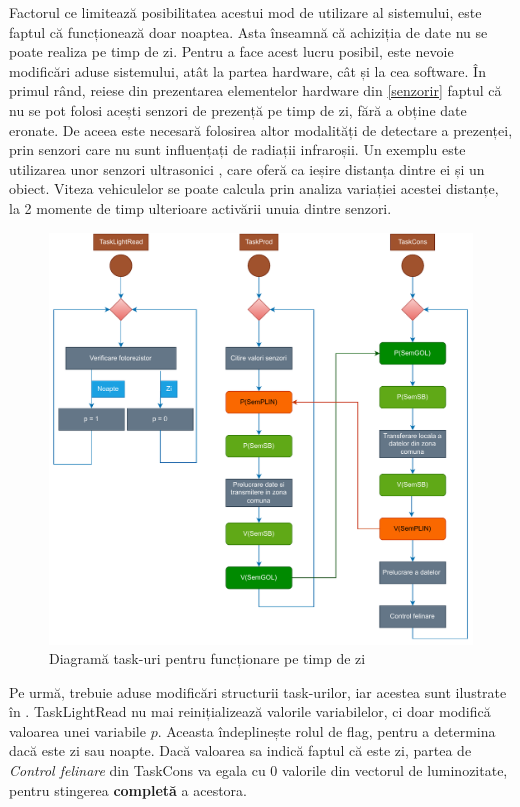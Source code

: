 Factorul ce limitează posibilitatea acestui mod de utilizare al sistemului, este faptul că funcționează doar noaptea. Asta înseamnă că achiziția de date nu se poate realiza pe timp de zi. Pentru a face acest lucru posibil, este nevoie modificări aduse sistemului, atât la partea hardware, cât și la cea software. În primul rând, reiese din prezentarea elementelor hardware din \autoref{senzorir} faptul că nu se pot folosi acești senzori de prezență pe timp de zi, fără a obține date eronate. De aceea este necesară folosirea altor modalități de detectare a prezenței, prin senzori care nu sunt influențați de radiații infraroșii. Un exemplu este utilizarea unor senzori ultrasonici \cite{7456689}, care oferă ca ieșire distanța dintre ei și un obiect. Viteza vehiculelor se poate calcula prin analiza variației acestei distanțe, la 2 momente de timp ulterioare activării unuia dintre senzori.

\begin{figure}[!ht]
    \begin{center}
    \includegraphics[width=0.9\linewidth,keepaspectratio]{pics/diag2.drawio.pdf}
    \end{center}
    \caption{Diagramă task-uri pentru funcționare pe timp de zi}
    \label{fig:dtask2}
\end{figure}

Pe urmă, trebuie aduse modificări structurii task-urilor, iar acestea sunt ilustrate în . TaskLightRead nu mai reinițializează valorile variabilelor, ci doar modifică valoarea unei variabile $p$. Aceasta îndeplinește rolul de flag, pentru a determina dacă este zi sau noapte. Dacă valoarea sa indică faptul că este zi, partea de \emph{Control felinare} din TaskCons va egala cu 0 valorile din vectorul de luminozitate, pentru stingerea \textbf{completă} a acestora.

